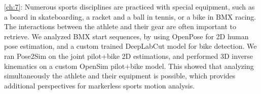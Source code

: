 \vspace*{0.2cm}
\noindent\autoref{ch:7}: Numerous sports disciplines are practiced with special equipment, such as a board in skateboarding, a racket and a ball in tennis, or a bike in BMX racing. The interactions between the athlete and their gear are often important to retrieve. We analyzed BMX start sequences, by using OpenPose for 2D human pose estimation, and a custom trained DeepLabCut model for bike detection. We ran Pose2Sim on the joint {pilot+bike} 2D estimations, and performed 3D inverse kinematics on a custom OpenSim {pilot+bike} model. This showed that analyzing simultaneously the athlete and their equipment is possible, which provides additional perspectives for markerless sports motion analysis. 


